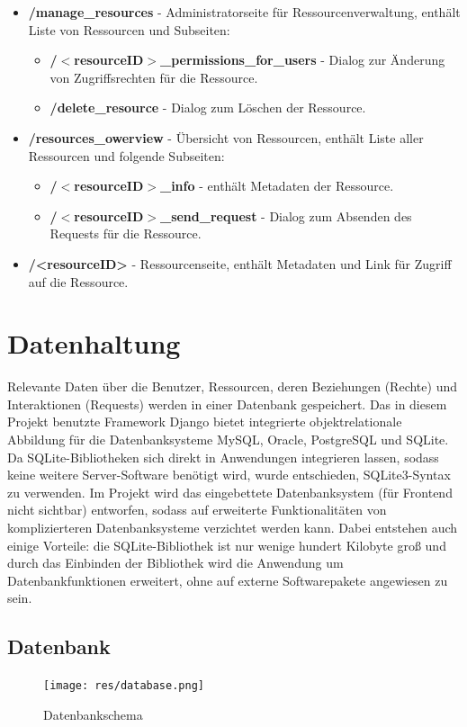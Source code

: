 \documentclass[parskip=full,11pt]{scrartcl}
\begin{document}
\begin{itemize}[itemsep=0pt]
\item \textbf{/manage{\_}resources} - Administratorseite für Ressourcenverwaltung, enthält Liste von Ressourcen und Subseiten:
\begin{itemize}[itemsep=0pt]
\item \textbf{/$<$resourceID$>${\_}permissions{\_}for{\_}users} - Dialog zur Änderung von Zugriffsrechten für die Ressource. 
\item \textbf{/delete{\_}resource} - Dialog zum Löschen der Ressource.
\end{itemize}
\item \textbf{/resources{\_}owerview} - Übersicht von Ressourcen, enthält Liste aller Ressourcen und folgende Subseiten:
\begin{itemize}[itemsep=0pt]
\item \textbf{/$<$resourceID$>${\_}info} - enthält Metadaten der Ressource.
\item \textbf{/$<$resourceID$>${\_}send{\_}request} - Dialog zum Absenden des Requests für die Ressource.
\end{itemize}
\item \textbf{/<resourceID>} - Ressourcenseite, enthält Metadaten und Link für Zugriff auf die Ressource.
\end{itemize} 

 
 
 \section{Datenhaltung}
 
Relevante Daten über die Benutzer, Ressourcen, deren Beziehungen (Rechte) und Interaktionen (Requests) werden in einer Datenbank gespeichert. Das in diesem Projekt benutzte Framework Django bietet integrierte  objektrelationale Abbildung für die Datenbanksysteme MySQL, Oracle, PostgreSQL und SQLite.\\
Da SQLite-Bibliotheken sich direkt in Anwendungen integrieren lassen, sodass keine weitere Server-Software benötigt wird, wurde entschieden, SQLite3-Syntax zu verwenden. Im Projekt wird das eingebettete Datenbanksystem (für Frontend nicht sichtbar) entworfen, sodass auf erweiterte Funktionalitäten von komplizierteren Datenbanksysteme verzichtet werden kann. Dabei entstehen auch einige Vorteile: die SQLite-Bibliothek ist nur wenige hundert Kilobyte groß und durch das Einbinden der Bibliothek wird die Anwendung um Datenbankfunktionen erweitert, ohne auf externe Softwarepakete angewiesen zu sein.
 \subsection{Datenbank}
 \begin{figure}[ht!]
 	\centering
 	\texttt{[image: res/database.png]}
 	\caption{Datenbankschema}
 \end{figure}
 \newpage
 
\end{document}
